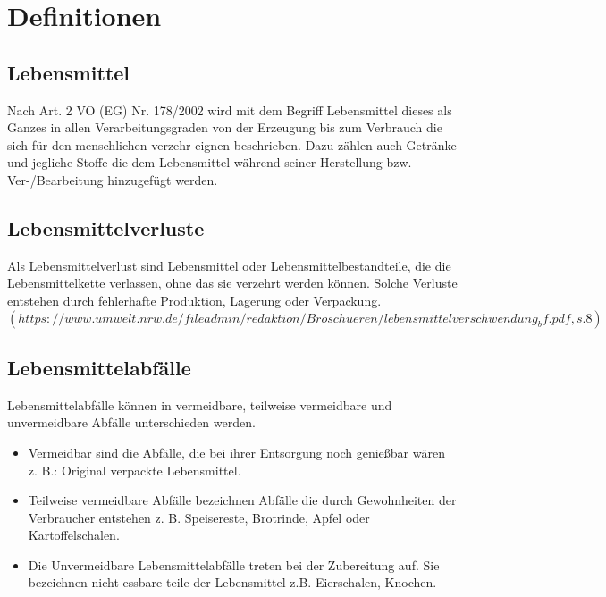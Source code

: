 \newpage

\section{Definitionen}
\subsection{Lebensmittel}
Nach Art. 2 VO (EG) Nr. 178/2002 wird mit dem Begriff Lebensmittel dieses als Ganzes in allen Verarbeitungsgraden von der Erzeugung bis zum Verbrauch die sich für den menschlichen verzehr eignen beschrieben. Dazu zählen auch Getränke und jegliche Stoffe die dem Lebensmittel während seiner Herstellung bzw. Ver-/Bearbeitung hinzugefügt werden. 

\subsection{Lebensmittelverluste}
Als Lebensmittelverlust sind Lebensmittel oder Lebensmittelbestandteile, die die Lebensmittelkette verlassen, ohne das sie verzehrt werden können. Solche Verluste entstehen durch fehlerhafte Produktion, Lagerung oder Verpackung.  $(https://www.umwelt.nrw.de/fileadmin/redaktion/Broschueren/lebensmittelverschwendung_bf.pdf , s.8)$ 
\subsection{Lebensmittelabfälle}
Lebensmittelabfälle können in vermeidbare, teilweise vermeidbare und unvermeidbare Abfälle unterschieden werden. %
\begin{itemize}
 \item Vermeidbar sind die Abfälle, die bei ihrer Entsorgung noch genießbar wären z. B.: Original verpackte Lebensmittel. %
  \item Teilweise vermeidbare Abfälle bezeichnen Abfälle die durch Gewohnheiten der Verbraucher entstehen z. B. Speisereste, Brotrinde, Apfel oder Kartoffelschalen. %
  \item Die Unvermeidbare Lebensmittelabfälle treten bei der Zubereitung auf. Sie bezeichnen nicht essbare teile der Lebensmittel z.B. Eierschalen, Knochen.%
 
\end{itemize}
 


